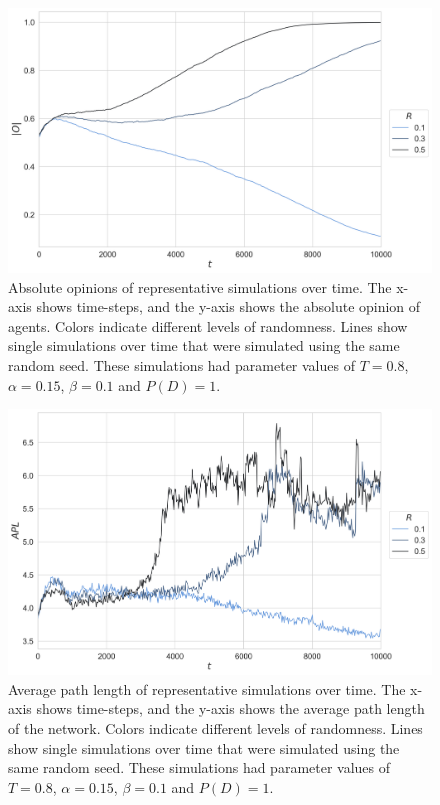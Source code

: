 \documentclass[11pt]{article}
\begin{document}
\begin{figure}[H]
    \centering
    \includegraphics[width=.7\linewidth]{../plots/example/Example_Absolute_Opinion.png}
  \caption{Absolute opinions of representative simulations over time. The x-axis shows time-steps, and the y-axis shows the absolute opinion of agents. Colors indicate different levels of randomness. Lines show single simulations over time that were simulated using the same random seed. These simulations had parameter values of $T = 0.8$, $\alpha = 0.15$, $\beta = 0.1$ and $P(D)=1$.}
  \label{fig:example_abs_opinion}
\end{figure}

\begin{figure}[H]
    \centering
    \includegraphics[width=.7\linewidth]{../plots/example/Example_Average_Path_Length.png}
  \caption{Average path length of representative simulations over time. The x-axis shows time-steps, and the y-axis shows the average path length of the network. Colors indicate different levels of randomness. Lines show single simulations over time that were simulated using the same random seed. These simulations had parameter values of $T = 0.8$, $\alpha = 0.15$, $\beta = 0.1$ and $P(D)=1$.}
  \label{fig:example_path}
\end{figure}
\end{document}
